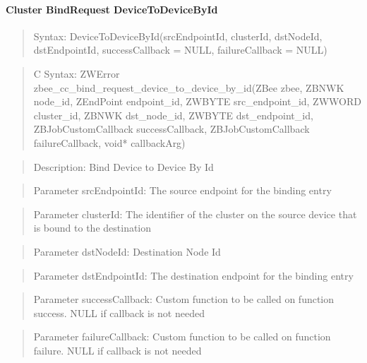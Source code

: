 \paragraph{Cluster BindRequest DeviceToDeviceById}
\begin{quote}Syntax: DeviceToDeviceById(srcEndpointId, clusterId, dstNodeId, dstEndpointId, successCallback = NULL, failureCallback = NULL)\end{quote}
\begin{quote}C Syntax: ZWError zbee\_cc\_bind\_request\_device\_to\_device\_by\_id(ZBee zbee, ZBNWK node\_id, ZEndPoint endpoint\_id, ZWBYTE src\_endpoint\_id, ZWWORD cluster\_id, ZBNWK dst\_node\_id, ZWBYTE dst\_endpoint\_id, ZBJobCustomCallback successCallback, ZBJobCustomCallback failureCallback, void* callbackArg)\end{quote}
\begin{quote}Description: Bind Device to Device By Id\end{quote}
\begin{quote}Parameter srcEndpointId: The source endpoint for the binding entry\end{quote}
\begin{quote}Parameter clusterId: The identifier of the cluster on the source device that is bound to the destination\end{quote}
\begin{quote}Parameter dstNodeId: Destination Node Id\end{quote}
\begin{quote}Parameter dstEndpointId: The destination endpoint for the binding entry\end{quote}
\begin{quote}Parameter successCallback: Custom function to be called on function success. NULL if callback is not needed\end{quote}
\begin{quote}Parameter failureCallback: Custom function to be called on function failure. NULL if callback is not needed\end{quote}


